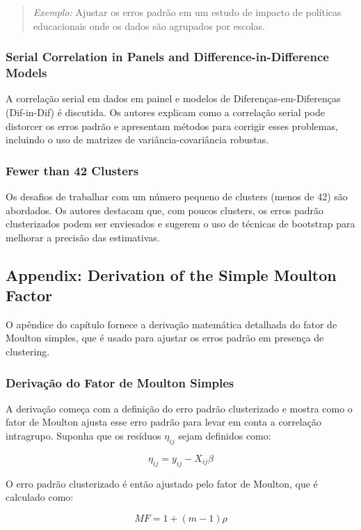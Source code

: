 \documentclass[a4paper,12pt]{article}[abntex2]
\begin{document}
\begin{quote}
\textit{Exemplo:} Ajustar os erros padrão em um estudo de impacto de políticas educacionais onde os dados são agrupados por escolas.
\end{quote}

\subsubsection{Serial Correlation in Panels and Difference-in-Difference Models}
A correlação serial em dados em painel e modelos de Diferenças-em-Diferenças (Dif-in-Dif) é discutida. Os autores explicam como a correlação serial pode distorcer os erros padrão e apresentam métodos para corrigir esses problemas, incluindo o uso de matrizes de variância-covariância robustas.

\subsubsection{Fewer than 42 Clusters}
Os desafios de trabalhar com um número pequeno de clusters (menos de 42) são abordados. Os autores destacam que, com poucos clusters, os erros padrão clusterizados podem ser enviesados e sugerem o uso de técnicas de bootstrap para melhorar a precisão das estimativas.

\subsection{Appendix: Derivation of the Simple Moulton Factor}
O apêndice do capítulo fornece a derivação matemática detalhada do fator de Moulton simples, que é usado para ajustar os erros padrão em presença de clustering.

\subsubsection{Derivação do Fator de Moulton Simples}
A derivação começa com a definição do erro padrão clusterizado e mostra como o fator de Moulton ajusta esse erro padrão para levar em conta a correlação intragrupo. Suponha que os resíduos \( \eta_{ij} \) sejam definidos como:

\begin{equation}
\eta_{ij} = y_{ij} - X_{ij}\beta
\end{equation}

O erro padrão clusterizado é então ajustado pelo fator de Moulton, que é calculado como:

\begin{equation}
MF = 1 + (m-1) \rho
\end{equation}
\end{document}
